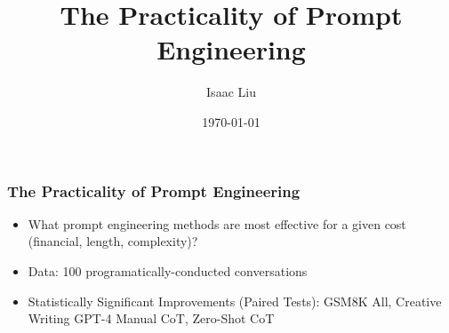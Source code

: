 \documentclass{beamer}
\title[The Practicality of Prompt Engineering]{The Practicality of Prompt Engineering}
\author{Isaac Liu}
\date{\today}
\begin{document}
    \begin{frame}
        \frametitle{The Practicality of Prompt Engineering}
        \begin{itemize}
            \item What prompt engineering methods are most effective for a given cost (financial, length, complexity)?
            \item Data: 100 programatically-conducted conversations
            \item Statistically Significant Improvements (Paired Tests): GSM8K All, Creative Writing GPT-4 Manual CoT, Zero-Shot CoT
        \end{itemize}

        \begin{figure}[h]


\end{figure}
\end{frame}
\end{document}

